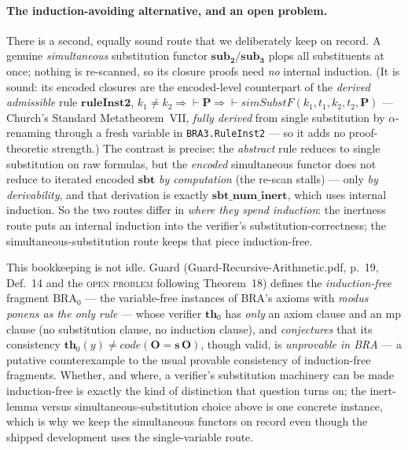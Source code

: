 \documentclass[11pt]{article}
\theoremstyle{plain}
\theoremstyle{definition}
\theoremstyle{remark}
\newcommand{\code}[1]{\mathit{code}(#1)}
\newcommand{\sbt}{\mathbf{sbt}}
\newcommand{\subtwo}{\mathbf{sub_2}}
\begin{document}
\paragraph{The induction-avoiding alternative, and an open problem.}  There
is a second, equally sound route that we deliberately keep on record.  A
genuine \emph{simultaneous} substitution functor $\subtwo/\mathbf{sub_3}$
plops all substituents at once; nothing is re-scanned, so its closure proofs
need \emph{no} internal induction.  (It is sound: its encoded closures are
the encoded-level counterpart of the \emph{derived admissible} rule
$\mathbf{ruleInst2}$, $k_1\neq k_2 \Rightarrow {\vdash}\mathbf{P} \Rightarrow
{\vdash}\mathit{simSubstF}(k_1,t_1,k_2,t_2,\mathbf{P})$ --- Church's Standard
Metatheorem~VII, \emph{fully derived} from single substitution by
$\alpha$-renaming through a fresh variable in \verb|BRA3.RuleInst2| --- so it
adds no proof-theoretic strength.)  The contrast is precise: the
\emph{abstract} rule reduces to single substitution on raw formulas, but the
\emph{encoded} simultaneous functor does not reduce to iterated encoded
$\sbt$ \emph{by computation} (the re-scan stalls) --- only \emph{by
derivability}, and that derivation is exactly $\mathbf{sbt\_num\_inert}$,
which uses internal induction.  So the two routes differ in \emph{where they
spend induction}: the inertness route puts an internal induction into the
verifier's substitution-correctness; the simultaneous-substitution route
keeps that piece induction-free.

This bookkeeping is not idle.  Guard (Guard-Recursive-Arithmetic.pdf, p.~19, Def.~14 and the
\textsc{open problem} following Theorem~18) defines the \emph{induction-free}
fragment $\mathrm{BRA}_0$ --- the variable-free instances of BRA's axioms
with \emph{modus ponens as the only rule} --- whose verifier $\mathbf{th}_0$
has \emph{only} an axiom clause and an mp clause (no substitution clause, no
induction clause), and \emph{conjectures} that its consistency
$\mathbf{th}_0(y) \neq \code{\mathbf{O}=\mathbf{s}\,\mathbf{O}}$, though
valid, is \emph{unprovable in BRA} --- a putative counterexample to the usual
provable consistency of induction-free fragments.  Whether, and where, a
verifier's substitution machinery can be made induction-free is exactly the
kind of distinction that question turns on; the inert-lemma versus
simultaneous-substitution choice above is one concrete instance, which is why
we keep the simultaneous functors on record even though the shipped
development uses the single-variable route.
\end{document}
